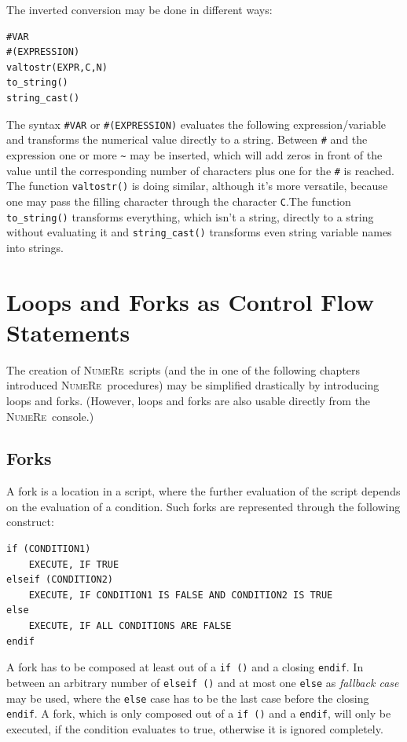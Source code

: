 \documentclass[DIV=14,headsepline,footsepline]{scrbook}
\newcommand{\NR}{\textsc{Nu\-me\-Re}}
\begin{document}
				The inverted conversion may be done in different ways:
				\begin{lstlisting}
#VAR
#(EXPRESSION)
valtostr(EXPR,C,N)
to_string()
string_cast()
				\end{lstlisting}
				The syntax \lstinline+#VAR+ or \lstinline+#(EXPRESSION)+ evaluates the following expression/variable and transforms the numerical value directly to a string. Between \lstinline+#+ and the expression one or more \lstinline+~+ may be inserted, which will add zeros in front of the value until the corresponding number of characters plus one for the \lstinline+#+ is reached. The function \lstinline+valtostr()+ is doing similar, although it's more versatile, because one may pass the filling character through the character \lstinline+C+.The function \lstinline+to_string()+ transforms everything, which isn't a string, directly to a string without evaluating it and \lstinline+string_cast()+ transforms even string variable names into strings.
		\chapter{Loops and Forks as Control Flow Statements}
			The creation of \NR\ scripts (and the in one of the following chapters introduced \NR\ procedures) may be simplified drastically by introducing loops and forks. (However, loops and forks are also usable directly from the \NR\ console.)
			\section{Forks}
				A fork is a location in a script, where the further evaluation of the script depends on the evaluation of a condition. Such forks are represented through the following construct:
				\begin{lstlisting}
if (CONDITION1)
	EXECUTE, IF TRUE
elseif (CONDITION2)
	EXECUTE, IF CONDITION1 IS FALSE AND CONDITION2 IS TRUE
else
	EXECUTE, IF ALL CONDITIONS ARE FALSE
endif
				\end{lstlisting}
				
				A fork has to be composed at least out of a \lstinline+if ()+ and a closing \lstinline+endif+. In between an arbitrary number of \lstinline+elseif ()+ and at most one \lstinline+else+ as \emph{fallback case} may be used, where the \lstinline+else+ case has to be the last case before the closing \lstinline+endif+. A fork, which is only composed out of a \lstinline+if ()+ and a \lstinline+endif+, will only be executed, if the condition evaluates to true, otherwise it is ignored completely.
			
\end{document}
